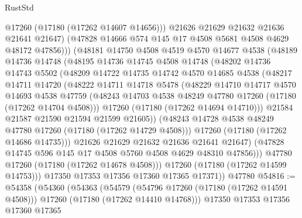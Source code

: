 \begin{lexlean}{RustStd}
\begin{coremodule}
{\begin{coremodule}
{{{{{{{{{{{{{{{{{{{{{{{{{{{{{{{{{{{{{{{{{{{{{{{{{{{{{{{                  @17260
                  (@17180 (@17262 @14607 @14656)))
                @21626
                @21629
                @21632
                @21636
                @21641
                @21647)
              (@47828 @14666 @574 @145 @17 @4508 @5681 @4508 @4629 @48172 @47856)))
          (@48181
            @14750
            @4508
            @4519
            @4570
            @14677
            @4538
            (@48189
              @14736
              @14748
              (@48195
                @14736
                @14745
                @4508
                @14748
                (@48202
                  @14736
                  @14743
                  @5502
                  (@48209
                    @14722
                    @14735
                    @14742
                    @4570
                    @14685
                    @4538
                    (@48217
                      @14711
                      @14720
                      (@48222
                        @14711
                        @14718
                        @5478
                        (@48229
                          @14710
                          @14717
                          @4570
                          @14693
                          @4538
                          @47759
                          (@48243 @14703 @4538 @48249 @47780 @17260 (@17180 (@17262 @14704 @4508)))
                          @17260
                          (@17180 (@17262 @14694 @14710)))
                        @21584
                        @21587
                        @21590
                        @21594
                        @21599
                        @21605))
                    (@48243 @14728 @4538 @48249 @47780 @17260 (@17180 (@17262 @14729 @4508)))
                    @17260
                    (@17180 (@17262 @14686 @14735)))
                  @21626
                  @21629
                  @21632
                  @21636
                  @21641
                  @21647)
                (@47828 @14745 @596 @145 @17 @4508 @5760 @4508 @4629 @48310 @47856)))
            @47780
            @17260
            (@17180 (@17262 @14678 @4508)))
          @17260
          (@17180 (@17262 @14599 @14753)))
        @17350
        @17353
        @17356
        @17360
        @17365
        @17371))
    @47780
@54816 := @54358
    (@54360
      (@54363
        (@54579
          (@54796 @17260 (@17180 (@17262 @14591 @4508)))
          @17260
          (@17180 (@17262 @14410 @14768)))
        @17350
        @17353
        @17356
        @17360
        @17365
}}}}}}}}}}}}}}}}}}}}}}}}}}}}}}}}}}}}}}}}}}}}}}}}}}}}}}}
\end{coremodule}}
\end{coremodule}
\end{lexlean}
